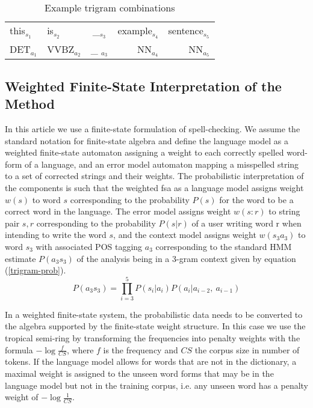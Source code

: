 \documentclass{llncs}
\begin{document}
\begin{table}
\caption{Example trigram combinations\label{fig:example}}
\begin{center}
\begin{tabular}{llcrr}
\hline
this$_{s_1}$ & is$_{s_2}$ & \_$_{s_3}$ & example$_{s_4}$ & sentence$_{s_5}$\\
DET$_{a_1}$ & VVBZ$_{a_2}$ & \_ $_{a_3}$& NN$_{a_4}$ & NN$_{a_5}$\\
\hline
\end{tabular}
\end{center}
\end{table}

\subsection{Weighted Finite-State Interpretation of the Method}

In this article we use a finite-state formulation of
spell-checking. We assume the standard notation for finite-state
algebra and define the language model as a weighted finite-state
automaton assigning a weight to each correctly spelled word-form of a
language, and an error model automaton mapping a misspelled string to
a set of corrected strings and their weights. The probabilistic
interpretation of the components is such that the weighted fsa as a
language model assigns weight $w(s)$ to word $s$ corresponding to the
probability $P(s)$ for the word to be a correct word in the
language. The error model assigns weight $w(s:r)$ to string pair $s,
r$ corresponding to the probability $P(s|r)$ of a user writing word r
when intending to write the word $s$, and the context model assigns
weight $w(s_3 a_3)$ to word $s_3$ with associated POS tagging $a_3$
corresponding to the standard HMM estimate $P(a_3 s_3)$ of the analysis being in
a 3-gram context given by equation (\ref{trigram-prob}).
\begin{equation}\label{trigram-prob}
P(a_3 s_3) = \prod_{i=3}^{5}P(s_i|a_i)P(a_i|a_{i-2},\ a_{i-1})
\end{equation}


In a weighted finite-state system, the probabilistic data needs to be converted
to the algebra supported by the finite-state weight structure.
In this case we use the tropical semi-ring by transforming the
frequencies into penalty weights with the formula $-\log\frac{f}{CS}$, where $f$ is
the frequency and $CS$ the corpus size in number of tokens. If the language
model allows for words that are not in the dictionary, a maximal weight is assigned
to the unseen word forms that may be in the language model but not in the training
corpus, i.e.  any unseen word has a penalty weight of $-\log\frac{1}{CS}$.
\end{document}
